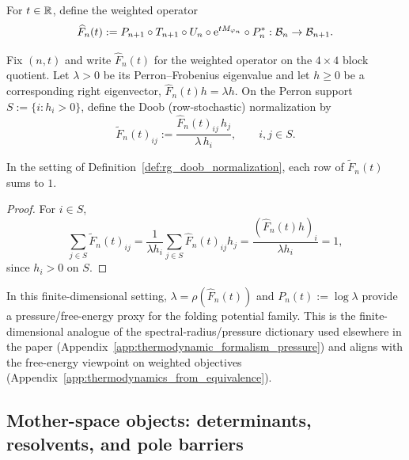 \begin{definition}\label{def:weighted_protocol_rg_operator_appendix}
\MathTag For $t\in\mathbb{R}$, define the weighted operator
\[
\widehat F_n(t):=P_{n+1}\circ T_{n+1}\circ U_n\circ \mathrm{e}^{tM_{\varphi_n}}\circ P_n^\ast:\mathcal{B}_n\to\mathcal{B}_{n+1}.
\]
\end{definition}

\begin{definition}\label{def:rg_doob_normalization}
\MathTag Fix $(n,t)$ and write $\widehat F_n(t)$ for the weighted operator on the $4\times4$ block quotient.
Let $\lambda>0$ be its Perron--Frobenius eigenvalue and let $h\ge 0$ be a corresponding right eigenvector, $\widehat F_n(t)h=\lambda h$.
On the Perron support $S:=\{i:h_i>0\}$, define the Doob (row-stochastic) normalization by
\[
\widetilde F_n(t)_{ij}:=\frac{\widehat F_n(t)_{ij}\,h_j}{\lambda\,h_i},
\qquad i,j\in S.
\]
\end{definition}

\begin{lemma}\label{lem:rg_doob_row_stochastic}
\MathTag In the setting of Definition~\ref{def:rg_doob_normalization}, each row of $\widetilde F_n(t)$ sums to $1$.
\end{lemma}
\begin{proof}
For $i\in S$,
\[
\sum_{j\in S}\widetilde F_n(t)_{ij}
=\frac{1}{\lambda h_i}\sum_{j\in S}\widehat F_n(t)_{ij}h_j
=\frac{(\widehat F_n(t)h)_i}{\lambda h_i}
=1,
\]
since $h_i>0$ on $S$.
\end{proof}

\begin{remark}\label{rem:rg_pressure_proxy}
\AuditTag In this finite-dimensional setting, $\lambda=\rho(\widehat F_n(t))$ and $P_n(t):=\log\lambda$ provide a pressure/free-energy proxy for the folding potential family.
This is the finite-dimensional analogue of the spectral-radius/pressure dictionary used elsewhere in the paper (Appendix~\ref{app:thermodynamic_formalism_pressure}) and aligns with the free-energy viewpoint on weighted objectives (Appendix~\ref{app:thermodynamics_from_equivalence}).
\end{remark}

\subsection{Mother-space objects: determinants, resolvents, and pole barriers}
\label{subsec:rg_operator_mother_space_objects}

